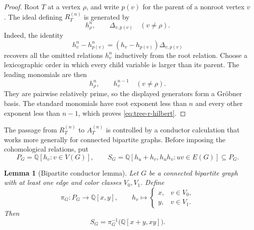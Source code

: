 \documentclass[11pt]{amsart}
\theoremstyle{plain}
\newtheorem{lemma}[theorem]{Lemma}
\theoremstyle{definition}
\theoremstyle{remark}
\newcommand{\Q}{\mathbb{Q}}
\begin{document}
\begin{proof}
Root $T$ at a vertex $\rho$, and write $p(v)$ for the parent of a nonroot
vertex $v$.  The ideal defining $R_T^{(n)}$ is generated by
\[
  h_\rho^n,
  \qquad
  \Delta_{v,p(v)}\quad(v\ne\rho).
\]
Indeed, the identity
\[
  h_v^n-h_{p(v)}^n
  =(h_v-h_{p(v)})\Delta_{v,p(v)}
\]
recovers all the omitted relations $h_v^n$ inductively from the root
relation.  Choose a lexicographic order in which every child variable is
larger than its parent.  The leading monomials are then
\[
  h_\rho^n,
  \qquad
  h_v^{n-1}\quad(v\ne\rho).
\]
They are pairwise relatively prime, so the displayed generators form a
Gr\"obner basis.  The standard monomials have root exponent less than $n$
and every other exponent less than $n-1$, which proves
\eqref{eq:tree-r-hilbert}.
\end{proof}

The passage from $R_T^{(n)}$ to $A_T^{(n)}$ is controlled by a conductor
calculation that works more generally for connected bipartite graphs.  Before
imposing the cohomological relations, put
\[
  P_G=\Q[h_v:v\in V(G)],
  \qquad
  S_G=\Q[h_u+h_v,h_uh_v:uv\in E(G)]\subseteq P_G.
\]

\begin{lemma}[Bipartite conductor lemma]\label{lem:bipartite-conductor}
Let $G$ be a connected bipartite graph with at least one edge and color
classes $V_0,V_1$.  Define
\[
  \pi_G:P_G\longrightarrow\Q[x,y],
  \qquad
  h_v\longmapsto
  \begin{cases}
    x,&v\in V_0,\\
    y,&v\in V_1.
  \end{cases}
\]
Then
\begin{equation}\label{eq:polynomial-bipartite-preimage}
  S_G=\pi_G^{-1}\bigl(\Q[x+y,xy]\bigr).
\end{equation}
\end{lemma}
\end{document}

